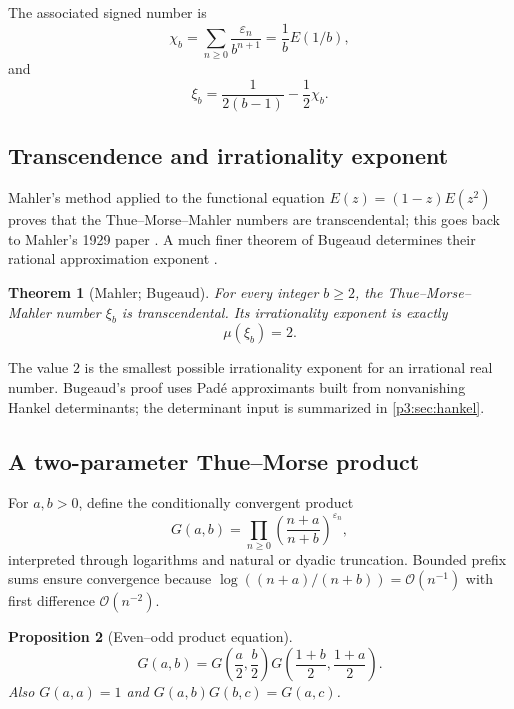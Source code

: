 \documentclass[11pt,oneside]{article}
\newtheorem{theorem}{Theorem}[section]
\newtheorem{proposition}[theorem]{Proposition}
\theoremstyle{definition}
\theoremstyle{remark}
\newcommand{\bigO}{\mathcal O}
\newcommand{\eps}{\varepsilon}
\begin{document}
The associated signed number is
\begin{equation}\label{p3:eq:signed-mahler-number}
 \chi_b=\sum_{n\ge0}\frac{\eps_n}{b^{n+1}}
 =\frac1bE(1/b),
\end{equation}
and
\begin{equation}\label{p3:eq:xi-chi}
 \xi_b=\frac1{2(b-1)}-\frac12\chi_b.
\end{equation}

\subsection{Transcendence and irrationality exponent}

Mahler's method applied to the functional equation
$E(z)=(1-z)E(z^2)$ proves that the Thue--Morse--Mahler numbers are
transcendental; this goes back to Mahler's 1929 paper
\cite{p3:mahler1929}.  A much finer theorem of Bugeaud determines their rational
approximation exponent \cite{p3:bugeaud2011}.

\begin{theorem}[Mahler; Bugeaud]\label{p3:thm:mahler-bugeaud}
For every integer $b\ge2$, the Thue--Morse--Mahler number $\xi_b$ is
transcendental.  Its irrationality exponent is exactly
\begin{equation}\label{p3:eq:irrationality-exponent-two}
 \mu(\xi_b)=2.
\end{equation}
\end{theorem}

The value $2$ is the smallest possible irrationality exponent for an
irrational real number.  Bugeaud's proof uses Pad\'e approximants built from
nonvanishing Hankel determinants; the determinant input is summarized in
\cref{p3:sec:hankel}.

\subsection{A two-parameter Thue--Morse product}

For $a,b>0$, define the conditionally convergent product
\begin{equation}\label{p3:eq:G-ab}
 G(a,b)=\prod_{n\ge0}
 \left(\frac{n+a}{n+b}\right)^{\eps_n},
\end{equation}
interpreted through logarithms and natural or dyadic truncation.  Bounded
prefix sums ensure convergence because
$\log((n+a)/(n+b))=\bigO(n^{-1})$ with first difference
$\bigO(n^{-2})$.

\begin{proposition}[Even--odd product equation]\label{p3:prop:G-functional}
\begin{equation}\label{p3:eq:G-functional}
 \boxed{\qquad
 G(a,b)=G\!\left(\frac a2,\frac b2\right)
 G\!\left(\frac{1+b}{2},\frac{1+a}{2}\right).
 \qquad}
\end{equation}
Also $G(a,a)=1$ and $G(a,b)G(b,c)=G(a,c)$.
\end{proposition}
\end{document}
